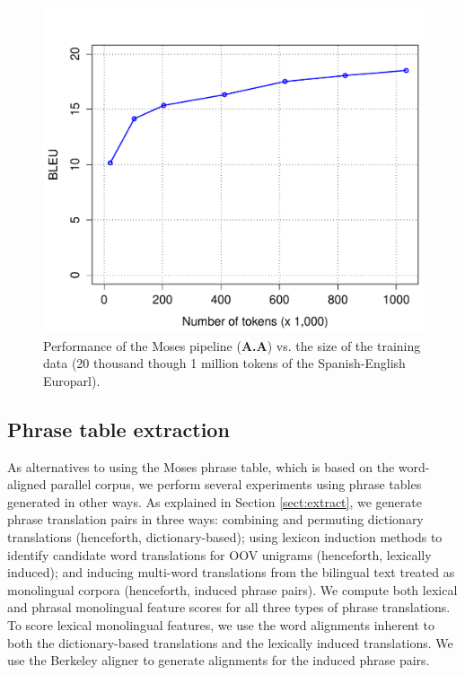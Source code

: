 \documentclass[11pt]{article}
\begin{document}
\begin{figure}[t]
\begin{center}
\includegraphics[width=\linewidth]{../figures/learning/learning.pdf}
\caption{Performance of the Moses pipeline ({\bf A.A}) vs. the size of the training data (20 thousand though 1 million tokens of the Spanish-English Europarl).}
\label{fig:learning}
\end{center}
\vskip -0.2in
\end{figure}

\subsection{Phrase table extraction}\label{sect:exp:pt}
As alternatives to using the Moses phrase table, which is based on the word-aligned parallel corpus, we perform several experiments using phrase tables generated in other ways. As explained in Section \ref{sect:extract}, we generate phrase translation pairs in three ways: combining and permuting dictionary translations (henceforth, dictionary-based); using lexicon induction methods to identify candidate word translations for OOV unigrams (henceforth, lexically induced); and inducing multi-word translations from the bilingual text treated as monolingual corpora (henceforth, induced phrase pairs). We compute both lexical and phrasal monolingual feature scores for all three types of phrase translations. To score lexical monolingual features, we use the word alignments inherent to both the dictionary-based translations and the lexically induced translations. We use the Berkeley aligner \cite{DeNero07} to generate alignments for the induced phrase pairs. 
\end{document}
